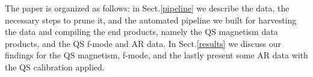 \documentclass{aa}
\begin{document}
The paper is organized as follows: in Sect.\ref{pipeline} we describe
the data, the necessary steps to prune it, and the automated pipeline we built for harvesting the data and compiling the end products, namely the QS magnetism data products, and the QS f-mode and AR data. In
Sect.\ref{results} we discuss our findings for the QS magnetism, f-mode, and the lastly present some AR data with the QS calibration
applied. 


\end{document}
